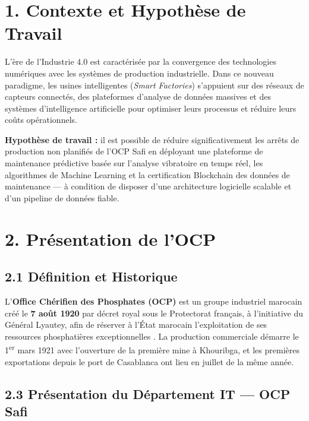 \documentclass[12pt, a4paper, oneside]{report}
\newcommand{\eng}[1]{\textit{#1}}
\begin{document}
\section*{1. Contexte et Hypothèse de Travail}

L'ère de l'Industrie 4.0 est caractérisée par la convergence des technologies numériques avec
les systèmes de production industrielle. Dans ce nouveau paradigme, les usines intelligentes
(\eng{Smart Factories}) s'appuient sur des réseaux de capteurs connectés, des plateformes
d'analyse de données massives et des systèmes d'intelligence artificielle pour optimiser leurs
processus et réduire leurs coûts opérationnels.

\textbf{Hypothèse de travail :} il est possible de réduire significativement les arrêts de
production non planifiés de l'OCP Safi en déployant une plateforme de maintenance prédictive
basée sur l'analyse vibratoire en temps réel, les algorithmes de Machine Learning et la
certification Blockchain des données de maintenance --- à condition de disposer d'une
architecture logicielle scalable et d'un pipeline de données fiable.

\section*{2. Présentation de l'OCP}

\subsection*{2.1 Définition et Historique}

L'\textbf{Office Chérifien des Phosphates (OCP)} est un groupe industriel marocain créé le
\textbf{7 août 1920} par décret royal sous le Protectorat français, à l'initiative du Général
Lyautey, afin de réserver à l'État marocain l'exploitation de ses ressources phosphatières
exceptionnelles \cite{ocpgroup}. La production commerciale démarre le
1\textsuperscript{er} mars 1921 avec l'ouverture de la première mine à Khouribga, et les
premières exportations depuis le port de Casablanca ont lieu en juillet de la même année.

\subsection*{2.3 Présentation du Département IT — OCP Safi}
\end{document}
